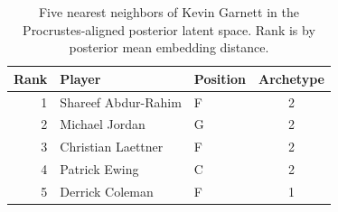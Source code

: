 \begin{table}[htbp]
  \centering\small
  \begin{tabular}{rllc}
    \toprule
    Rank & Player & Position & Archetype \\
    \midrule
    1 & Shareef Abdur-Rahim & F & 2 \\
    2 & Michael Jordan & G & 2 \\
    3 & Christian Laettner & F & 2 \\
    4 & Patrick Ewing & C & 2 \\
    5 & Derrick Coleman & F & 1 \\
    \bottomrule
  \end{tabular}
  \caption{Five nearest neighbors of Kevin Garnett in the Procrustes-aligned posterior latent space. Rank is by posterior mean embedding distance.}
  \label{tab:Kevin_Garnett_neighbors}
\end{table}

